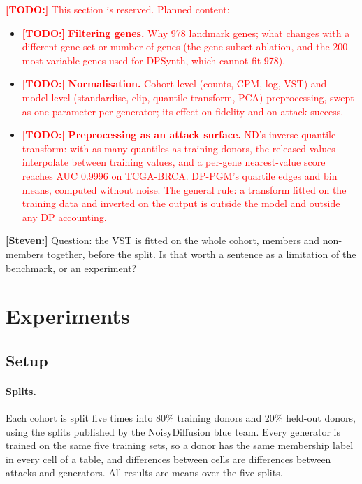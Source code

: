 \documentclass[webpdf,contemporary,large]{oup-authoring-template}
\newif\ifdraft \drafttrue
\newcommand{\annot}[3]{\ifdraft\textcolor{#1}{\textbf{[#2:]} #3}\fi}
\newcommand{\steven}[1]{\annot{Periwinkle}{Steven}{#1}}
\newcommand{\todo}[1]{\annot{red}{TODO}{#1}}
\begin{document}
\todo{This section is reserved. Planned content:}
\begin{itemize}
  \item \todo{\textbf{Filtering genes.} Why 978 landmark genes; what changes with a different gene set or number of genes (the gene-subset ablation, and the 200 most variable genes used for DPSynth, which cannot fit 978).}
  \item \todo{\textbf{Normalisation.} Cohort-level (counts, CPM, log, VST) and model-level (standardise, clip, quantile transform, PCA) preprocessing, swept as one parameter per generator; its effect on fidelity and on attack success.}
  \item \todo{\textbf{Preprocessing as an attack surface.} ND's inverse quantile transform: with as many quantiles as training donors, the released values interpolate between training values, and a per-gene nearest-value score reaches AUC 0.9996 on TCGA-BRCA. DP-PGM's quartile edges and bin means, computed without noise. The general rule: a transform fitted on the training data and inverted on the output is outside the model and outside any DP accounting.}
\end{itemize}
\steven{Question: the VST is fitted on the whole cohort, members and non-members together, before the split. Is that worth a sentence as a limitation of the benchmark, or an experiment?}

\section{Experiments}
\label{sec:experiments}

\subsection{Setup}
\label{sec:setup}

\paragraph{Splits.}
Each cohort is split five times into 80\% training donors and 20\% held-out donors, using the splits published by the NoisyDiffusion blue team. Every generator is trained on the same five training sets, so a donor has the same membership label in every cell of a table, and differences between cells are differences between attacks and generators. All results are means over the five splits.
\end{document}

